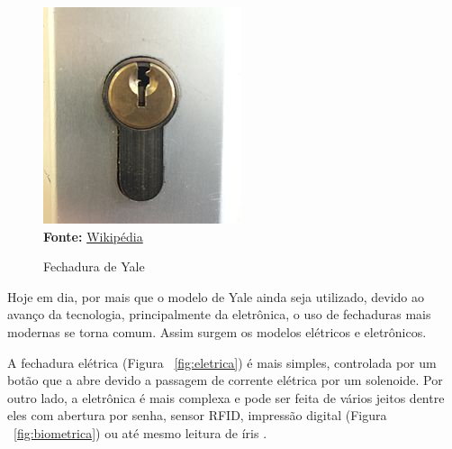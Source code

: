 \FloatBarrier
\begin{figure}[!htbp]
	\centering
	\caption{Fechadura de Yale}
	\includegraphics[scale=.4]{imagens/yale}
	\\\textbf{Fonte:} \href{https://pt.wikipedia.org/wiki/Fechadura_de_tambor_de_pinos}{Wikipédia}
	\label{fig:yale}
\end{figure}
\FloatBarrier

Hoje em dia, por mais que o modelo de Yale ainda seja utilizado, devido ao avanço
da tecnologia, principalmente da eletrônica, o uso de fechaduras mais modernas se torna
comum. Assim surgem os modelos elétricos e eletrônicos.


A fechadura elétrica (Figura ~\ref{fig:eletrica}) é mais simples, controlada por
um botão que a abre devido a passagem de corrente elétrica por um solenoide.
Por outro lado, a eletrônica é mais complexa e pode ser feita de vários jeitos
dentre eles com abertura por senha, sensor RFID, impressão digital
(Figura ~\ref{fig:biometrica}) ou até mesmo leitura de íris \cite{pires2020}.

